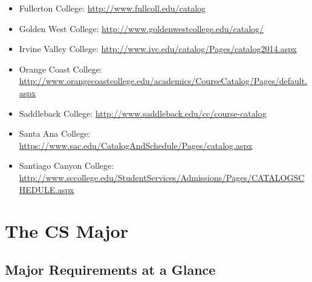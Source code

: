 \documentclass{book}
\begin{document}
\begin{itemize}
\begin{itemize}
    \item Fullerton College: \url{http://www.fullcoll.edu/catalog}
    \item Golden West College: \url{http://www.goldenwestcollege.edu/catalog/}
    \item Irvine Valley College: \url{http://www.ivc.edu/catalog/Pages/catalog2014.aspx}
    \item Orange Coast College: \url{http://www.orangecoastcollege.edu/academics/CourseCatalog/Pages/default.aspx}
    \item Saddleback College: \url{http://www.saddleback.edu/cc/course-catalog}
    \item Santa Ana College: \url{https://www.sac.edu/CatalogAndSchedule/Pages/catalog.aspx}
    \item Santiago Canyon College: \url{http://www.sccollege.edu/StudentServices/Admissions/Pages/CATALOGSCHEDULE.aspx}
  \end{itemize}
\end{itemize}

\chapter{The CS Major}

\section{Major Requirements at a Glance}
\end{document}
